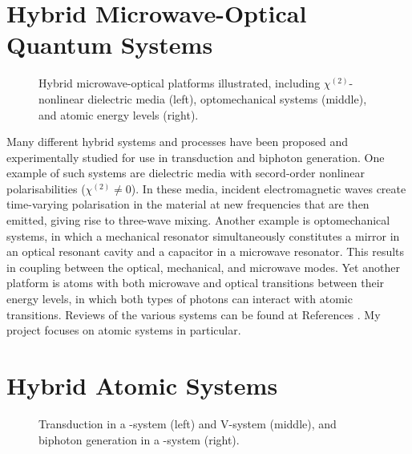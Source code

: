 \section{Hybrid Microwave-Optical Quantum Systems}
\begin{figure}[h]
\centering
    \begin{subfigure}{0.32\textwidth}
    \centering
\end{subfigure}
\begin{subfigure}{0.32\textwidth}
    \centering
\end{subfigure}
\begin{subfigure}{0.32\textwidth}
    \centering
\end{subfigure}
\caption{\label{fig:hybrid_systems} Hybrid microwave-optical platforms illustrated, including $\chi^{(2)}$-nonlinear dielectric media (left), optomechanical systems (middle), and atomic energy levels (right).}
\end{figure}
Many different hybrid systems and processes have been proposed and experimentally studied for use in transduction and biphoton generation. One example of such systems are dielectric media with secord-order nonlinear polarisabilities \cite{rueda_2016,rueda_2019,sahu_2023} ($\chi^{(2)} \neq 0$). In these media, incident electromagnetic waves create time-varying polarisation in the material at new frequencies that are then emitted, giving rise to three-wave mixing. Another example is optomechanical systems\cite{bochmann_2013,higginbotham_2018}, in which a mechanical resonator simultaneously constitutes a mirror in an optical resonant cavity and a capacitor in a microwave resonator. This results in coupling between the optical, mechanical, and microwave modes. Yet another platform is atoms with both microwave and optical transitions between their energy levels\cite{staudt_2012,probst_2013}, in which both types of photons can interact with atomic transitions. Reviews of the various systems can be found at References \cite{lambert_2020,lauk_2020}. My project focuses on atomic systems in particular.

\section{Hybrid Atomic Systems}
\begin{figure}[h]
\centering
{}
\caption{\label{fig:lambda_and_v_systems} Transduction in a \textLambda-system (left) and V-system (middle), and biphoton generation in a \textLambda-system (right).}
\end{figure}

